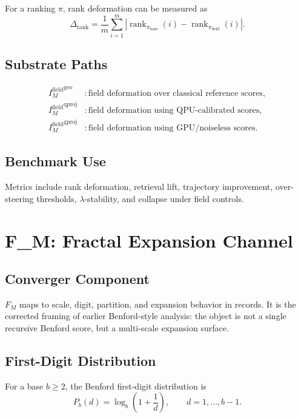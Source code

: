 \documentclass[11pt]{article}
\newcommand{\rank}{\operatorname{rank}}
\newcommand{\Imf}{I_M^{\mathrm{field}}}
\newcommand{\Fm}{F_M}
\newcommand{\geo}{\mathrm{geo}}
\newcommand{\qproj}{\mathrm{qproj}}
\newcommand{\gproj}{\mathrm{gproj}}
\begin{document}
For a ranking \(\pi\), rank deformation can be measured as
\begin{equation}
  \Delta_{\rank} =
  \frac{1}{m}\sum_{i=1}^{m}
  \left|
    \rank_{\pi_{\mathrm{base}}}(i)
    -
    \rank_{\pi_{\mathrm{field}}}(i)
  \right|.
\end{equation}

\subsection{Substrate Paths}

\begin{align}
  {\Imf}^{\geo}   &: \text{field deformation over classical reference scores},\\
  {\Imf}^{\qproj} &: \text{field deformation using QPU-calibrated scores},\\
  {\Imf}^{\gproj} &: \text{field deformation using GPU/noiseless scores}.
\end{align}

\subsection{Benchmark Use}

Metrics include rank deformation, retrieval lift, trajectory improvement,
over-steering thresholds, \(\lambda\)-stability, and collapse under field
controls.

\section{F\_M: Fractal Expansion Channel}

\subsection{Converger Component}

\(\Fm\) maps to scale, digit, partition, and expansion behavior in records. It
is the corrected framing of earlier Benford-style analysis: the object is not a
single recursive Benford score, but a multi-scale expansion surface.

\subsection{First-Digit Distribution}

For a base \(b\geq 2\), the Benford first-digit distribution is
\begin{equation}
  P_b(d) = \log_b\!\left(1+\frac{1}{d}\right),
  \qquad d=1,\dots,b-1.
\end{equation}
\end{document}
